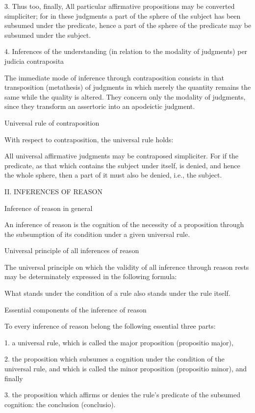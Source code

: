 3.  Thus too, finally,
    All particular affirmative propositions may be converted simpliciter;
    for in these judgments a part of the sphere of the subject
    has been subsumed under the predicate,
    hence a part of the sphere of the predicate
    may be subsumed under the subject.

4. Inferences of the understanding
(in relation to the modality of judgments)
per judicia contraposita

The immediate mode of inference through contraposition
consists in that transposition (metathesis) of judgments
in which merely the quantity remains the same
while the quality is altered.
They concern only the modality of judgments,
since they transform an assertoric into an apodeictic judgment.

Universal rule of contraposition

With respect to contraposition, the universal rule holds:

All universal affirmative judgments may be contraposed simpliciter.
For if the predicate, as that which contains the subject under itself,
is denied, and hence the whole sphere,
then a part of it must also be denied, i.e., the subject.

II. INFERENCES OF REASON

Inference of reason in general

An inference of reason is the cognition of the necessity of a proposition
through the subsumption of its condition under a given universal rule.

Universal principle of all inferences of reason

The universal principle on which the validity of
all inference through reason rests may be
determinately expressed in the following formula:

What stands under the condition of a rule
also stands under the rule itself.

Essential components of the inference of reason

To every inference of reason belong the following essential three parts:

1.  a universal rule, which is called the major proposition
    (propositio major),

2.  the proposition which subsumes a cognition
    under the condition of the universal rule,
    and which is called the minor proposition
    (propositio minor), and finally

3.  the proposition which affirms or denies
    the rule's predicate of the subsumed cognition:
    the conclusion (conclusio).

